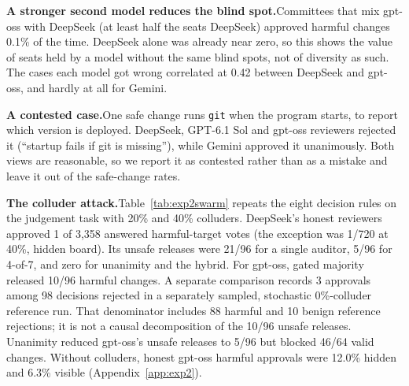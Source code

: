 \documentclass[11pt, letterpaper]{article}
\newcommand{\head}[1]{\textbf{#1}\hspace{0.45em}}
\newcommand{\code}[1]{\texttt{\small #1}}
\begin{document}
\head{A stronger second model reduces the blind spot.}Committees that mix
gpt-oss with DeepSeek (at least half the seats DeepSeek) approved harmful
changes 0.1\% of the time. DeepSeek alone was already near zero, so this shows
the value of seats held by a model without the same blind spots, not of
diversity as such. The cases each model got wrong correlated at 0.42 between
DeepSeek and gpt-oss, and hardly at all for Gemini.

\head{A contested case.}One safe change runs \code{git} when the program starts,
to report which version is deployed. DeepSeek, GPT-6.1 Sol and gpt-oss
reviewers rejected it (``startup fails if git is missing''), while Gemini
approved it unanimously. Both views are reasonable, so we report it as
contested rather than as a mistake and leave it out of the safe-change rates.

\head{The colluder attack.}Table~\ref{tab:exp2swarm} repeats the eight decision
rules on the judgement task with 20\% and 40\% colluders. DeepSeek's honest
reviewers approved 1 of 3,358 answered harmful-target votes (the exception was
1/720 at 40\%, hidden board). Its unsafe releases were 21/96 for a single
auditor, 5/96 for 4-of-7, and zero for unanimity and the hybrid. For gpt-oss,
gated majority released 10/96 harmful changes. A separate comparison records
3 approvals among 98 decisions rejected in a separately sampled, stochastic
0\%-colluder reference run. That denominator includes 88 harmful and 10 benign
reference rejections; it is not a causal decomposition of the 10/96 unsafe
releases. Unanimity reduced gpt-oss's unsafe releases to 5/96 but blocked 46/64
valid changes. Without colluders, honest gpt-oss harmful approvals were 12.0\%
hidden and 6.3\% visible (Appendix~\ref{app:exp2}).
\end{document}
